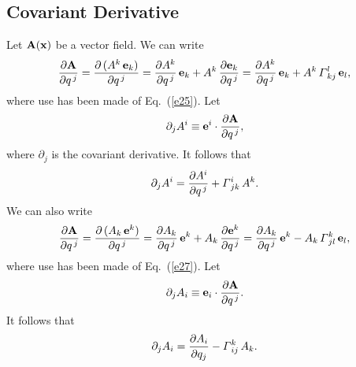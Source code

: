 \documentclass[12pt,prb,aps,notitlepage]{revtex4-1}
\begin{document}
\subsection{Covariant Derivative}
Let ${\bf A}({\bf x})$ be a vector field. 
We can write 
\begin{equation}
\frac{\partial {\bf A}}{\partial q^{\,j}} = \frac{\partial\,(A^k\,{\bf e}_k)}{\partial q^{\,j}} = \frac{\partial A^k}{\partial q^{\,j}}\,{\bf e}_k + A^k\,\frac{\partial {\bf e}_k}{\partial q^{\,j}}= 
 \frac{\partial A^k}{\partial q^{\,j}}\,{\bf e}_k +A^k\, {\mit\Gamma}^l_{\,kj}\,{\bf e}_l,
 \end{equation}
 where use has been made of Eq.~(\ref{e25}). Let
 \begin{equation}
 \partial_j A^i \equiv  {\bf e}^i\cdot\frac{\partial{\bf A}}{\partial q^{\,j}},
 \end{equation}
 where $\partial_j$ is the covariant derivative. 
 It follows that
 \begin{equation}\label{cov1}
 \partial_j A^i = \frac{\partial A^i}{\partial q^{\,j}} + {\mit\Gamma}^i_{\,jk}\,A^k.
 \end{equation}
 We can also write 
\begin{equation}
\frac{\partial {\bf A}}{\partial q^{\,j}} = \frac{\partial\,(A_k\,{\bf e}^k)}{\partial q^{\,j}} = \frac{\partial A_k}{\partial q^{\,j}}\,{\bf e}^k + A_k\,\frac{\partial {\bf e}^k}{\partial q^{\,j}}= 
 \frac{\partial A_k}{\partial q^{\,j}}\,{\bf e}^k -A_k\, {\mit\Gamma}^k_{\,jl}\,{\bf e}_l,
 \end{equation}
 where use has been made of Eq.~(\ref{e27}). Let
 \begin{equation}
 \partial_j A_i \equiv  {\bf e}_i\cdot\frac{\partial{\bf A}}{\partial q^{\,j}}.
 \end{equation}
 It follows that
 \begin{equation}\label{cov2}
 \partial_j A_i = \frac{\partial A_i}{\partial q_j} - {\mit\Gamma}^k_{\,ij}\,A_k.
 \end{equation}
 
\end{document}
